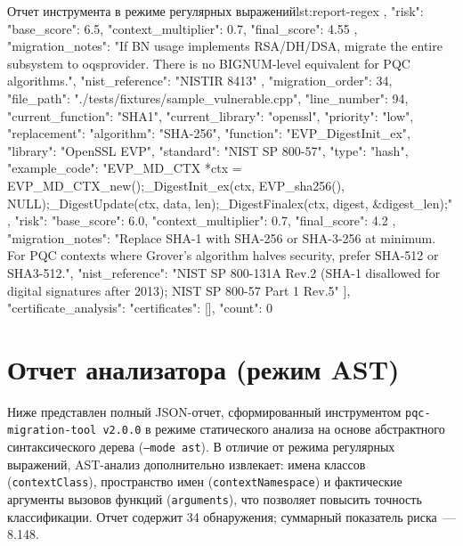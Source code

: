 \documentclass{itmo-vkr}
\begin{document}
\begin{itmolisting}[JSON]{Отчет инструмента в режиме регулярных выражений}{lst:report-regex}
{{{			},
			"risk": {
				"base_score": 6.5,
				"context_multiplier": 0.7,
				"final_score": 4.55
			},
			"migration_notes": "If BN usage implements RSA/DH/DSA, migrate the entire subsystem to oqsprovider. There is no BIGNUM-level equivalent for PQC algorithms.",
			"nist_reference": "NISTIR 8413"
		},
		{
			"migration_order": 34,
			"file_path": "./tests/fixtures/sample_vulnerable.cpp",
			"line_number": 94,
			"current_function": "SHA1",
			"current_library": "openssl",
			"priority": "low",
			"replacement": {
				"algorithm": "SHA-256",
				"function": "EVP_DigestInit_ex",
				"library": "OpenSSL EVP",
				"standard": "NIST SP 800-57",
				"type": "hash",
				"example_code": "EVP_MD_CTX *ctx = EVP_MD_CTX_new();\nEVP_DigestInit_ex(ctx, EVP_sha256(), NULL);\nEVP_DigestUpdate(ctx, data, len);\nEVP_DigestFinalex(ctx, digest, &digest_len);"
			},
			"risk": {
				"base_score": 6.0,
				"context_multiplier": 0.7,
				"final_score": 4.2
			},
			"migration_notes": "Replace SHA-1 with SHA-256 or SHA-3-256 at minimum. For PQC contexts where Grover's algorithm halves security, prefer SHA-512 or SHA3-512.",
			"nist_reference": "NIST SP 800-131A Rev.2 (SHA-1 disallowed for digital signatures after 2013); NIST SP 800-57 Part 1 Rev.5"
		}
		],
		"certificate_analysis": {
			"certificates": [],
			"count": 0
		}
	}
\end{itmolisting}

\section{Отчет анализатора (режим AST)}
\label{app:report-ast}

Ниже представлен полный JSON-отчет, сформированный инструментом \texttt{pqc-migration-tool~v2.0.0} в режиме статического анализа на основе абстрактного синтаксического дерева (\texttt{--mode ast}). В отличие от режима регулярных выражений, AST-анализ дополнительно извлекает: имена классов (\texttt{contextClass}), пространство имен (\texttt{contextNamespace}) и фактические аргументы вызовов функций (\texttt{arguments}), что позволяет повысить точность классификации. Отчет содержит 34 обнаружения; суммарный показатель риска~--- 8.148.
\end{document}
